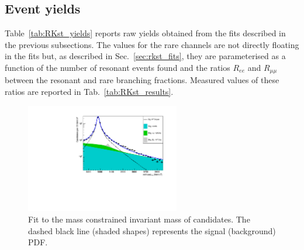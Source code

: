 \subsection{Event yields}

Table~\ref{tab:RKst_yields} reports raw yields obtained from the
fits described in the previous subsections. The values for the rare channels are not
directly floating in the fits but, as described in Sec.~\ref{sec:rkst_fits}, they are parameterised
as a function of the number of resonant events found and the ratios $R_{ee}$ and $R_{\mu\mu}$
between the resonant and rare branching fractions. Measured values of these ratios are reported 
in Tab.~\ref{tab:RKst_results}.


\begin{table}[t]
\centering
\caption{Raw yields of events found fitting invariant mass distributions of the rare and resonant events. }
\renewcommand\arraystretch{1.25}
\label{tab:RKst_yields}
\end{table}

\begin{figure}[h!]
\centering
\includegraphics[width=0.6\textwidth]{RKst/figs/Fit/fit_EE/fit_JPs_L_log.pdf}
\caption{Fit to the mass constrained \mKpiee invariant mass of \BdToKstJPsee candidates.
The dashed black line (shaded shapes) represents the signal (background) PDF.}
\label{fig:fitJPsEE}
\end{figure}


